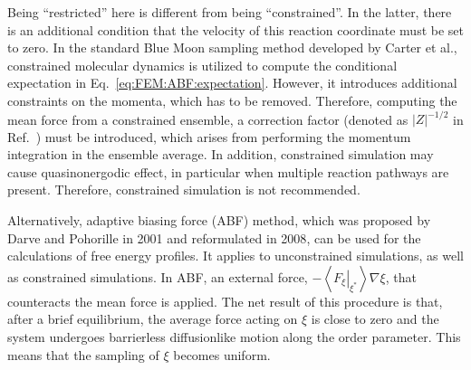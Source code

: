 Being ``restricted'' here is different from being ``constrained''. In the latter, there is an additional condition that the velocity of this reaction coordinate must be set to zero. In the standard Blue Moon sampling method developed by Carter et al.\cite{CarterCPL1989}, constrained molecular dynamics is utilized to compute the conditional expectation in Eq.~\ref{eq:FEM:ABF:expectation}. However, it introduces additional constraints on the momenta, which has to be removed. Therefore, computing the mean force from a constrained ensemble, a correction factor (denoted as $|Z|^{-1/2}$ in Ref.~\cite{CarterCPL1989}) must be introduced, which arises from performing the momentum integration in the ensemble average. In addition, constrained simulation may cause quasinonergodic effect, in particular when multiple reaction pathways are present. Therefore, constrained simulation is not recommended.

Alternatively, adaptive biasing force (ABF) method, which was proposed by Darve and Pohorille in 2001\cite{DarveJCP2001} and reformulated in 2008\cite{DarveJCP2008}, can be used for the calculations of free energy profiles. It applies to unconstrained simulations, as well as constrained simulations. In ABF, an external force, $-\left<\left. F_\xi\right|_{\xi^\ast}\right>\nabla \xi$, that counteracts the mean force is applied. The net result of this procedure is that, after a brief equilibrium, the average force acting on $\xi$ is close to zero and the system undergoes barrierless diffusionlike motion along the order parameter. This means that the sampling of $\xi$ becomes uniform.


